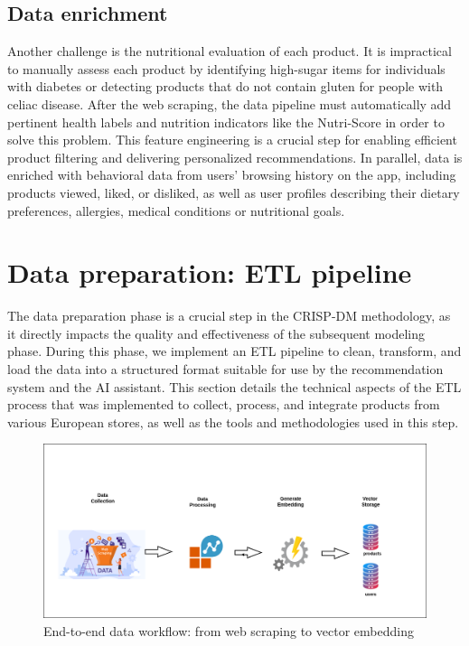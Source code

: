 

\subsection{Data enrichment}
Another challenge is the nutritional evaluation of each product. It is
impractical to manually assess each product by identifying high-sugar
items for individuals with diabetes or detecting products that do not
contain gluten for people with celiac disease. After the web scraping, the
data pipeline must automatically add pertinent health labels and nutrition
indicators like the Nutri-Score in order to solve this problem. This feature
engineering is a crucial step for enabling efficient product filtering and
delivering personalized recommendations. In parallel, data is enriched
with behavioral data from users’ browsing history on the app, including
products viewed, liked, or disliked, as well as user profiles describing their
dietary preferences, allergies, medical conditions or nutritional goals.

\section{Data preparation: ETL pipeline}


The data preparation phase is a crucial step in the CRISP-DM methodology, as it directly impacts the quality and effectiveness of the subsequent
modeling phase. During this phase, we implement an ETL pipeline to
clean, transform, and load the data into a structured format suitable for
use by the recommendation system and the AI assistant. This section
details the technical aspects of the ETL process that was implemented
to collect, process, and integrate products from various European stores,
as well as the tools and methodologies used in this step.

\begin{center}
\begin{figure}[H]
    \includegraphics[scale=0.39]{images/workflow__data.png}
    \caption{End-to-end data workflow: from web scraping to vector embedding}
    \label{fig:data_workflow}
\end{figure}
\end{center}

